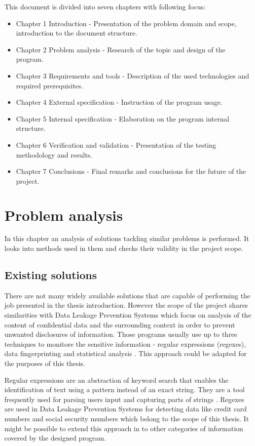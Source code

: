 \documentclass[a4paper,twoside,12pt]{book}
\begin{document}
This document is divided into seven chapters with following focus:

\begin{itemize}
   \item Chapter 1 Introduction - Presentation of the problem domain and scope, introduction to the document structure.
   \item Chapter 2 Problem analysis - Research of the topic and design of the program.
   \item Chapter 3 Requirements and tools - Description of the used technologies and required prerequisites.
   \item Chapter 4 External specification - Instruction of the program usage.
   \item Chapter 5 Internal specification - Elaboration on the program internal structure.
   \item Chapter 6 Verification and validation - Presentation of the testing methodology and results.
   \item Chapter 7 Conclusions - Final remarks and conclusions for the future of the project.
   \end{itemize}

\chapter{Problem analysis}

In this chapter an analysis of solutions tackling similar problems is performed. It looks into methods used in them and checks their validity in the project scope.

\section{Existing solutions}

There are not many widely available solutions that are capable of performing the job presented in the thesis introduction. However the scope of the project shares
similarities with Data Leakage Prevention Systems which focus on analysis of the content of confidential data and the surrounding context in order to
prevent unwanted disclosures of information. Those programs usually use up to three techniques to monitore the sensitive information - regular expressions (regexes),
data fingerprinting and statistical analysis \cite{bib:articleDLPS}. This approach could be adapted for the purposes of this thesis. 

Regular expressions are an abstraction of keyword search that enables the identification of text using a pattern instead of an exact string. They are a tool 
frequently used for parsing users input and capturing parts of strings \cite{bib:conferenceRegex}. Regexes are used in Data Leakage Prevention Systems for detecting 
data like credit card numbers and social security mumbers \cite{bib:articleDLPS} which belong to the scope of this thesis. It might be possible to extend this approach 
in to other categories of information covered by the designed program.
\end{document}
